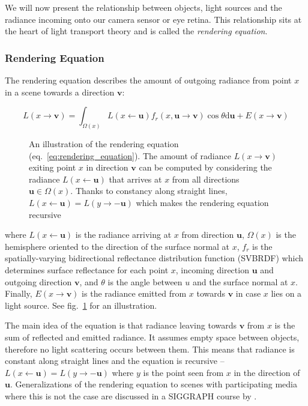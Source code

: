 We will now present the relationship between objects, light sources and the radiance incoming onto our camera sensor or eye retina. This relationship sits at the heart of light transport theory and is called the \textit{rendering equation}.

\subsubsection{Rendering Equation}
\label{section:background-projection_mapping-light_transport-rendering_equation}

The rendering equation describes the amount of outgoing radiance from point \(x\) in a scene towards a direction \(\bm{v}\):

\begin{equation}
    \label{eq:rendering_equation}
    L(x \rightarrow \bm{v}) = \int_{\Omega(x)} L(x \leftarrow \bm{u}) f_r(x, \bm{u} \rightarrow \bm{v}) \cos \theta \mathrm{d}\bm{u} + E(x \rightarrow \bm{v})
\end{equation}

\begin{figure}[t]
    \centering
    \def\svgwidth{0.6\textwidth}
    
    \caption{An illustration of the rendering equation (eq.~\ref{eq:rendering_equation}). The amount of radiance \(L(x \rightarrow \bm{v})\) exiting point \(x\) in direction \(\bm{v}\) can be computed by considering the radiance \(L(x \leftarrow \bm{u})\) that arrives at \(x\) from all directions \(\bm{u} \in \Omega(x)\). Thanks to constancy along straight lines, \(L(x \leftarrow \bm{u}) = L(y \rightarrow \bm{-u})\) which makes the rendering equation recursive}
    \label{fig:background_rendering_eq}
\end{figure}

where \(L(x \leftarrow \bm{u})\) is the radiance arriving at \(x\) from direction \(\bm{u}\), \(\Omega(x)\) is the hemisphere oriented to the direction of the surface normal at \(x\), \(f_r\) is the spatially-varying bidirectional reflectance distribution function (SVBRDF) which determines surface reflectance for each point \(x\), incoming direction \(\bm{u}\) and outgoing direction \(\bm{v}\), and \(\theta\) is the angle between \(u\) and the surface normal at \(x\). Finally, \(E(x \rightarrow \bm{v})\) is the radiance emitted from \(x\) towards \(\bm{v}\) in case \(x\) lies on a light source. See fig.~\ref{fig:background_rendering_eq} for an illustration.

The main idea of the equation is that radiance leaving towards \(\bm{v}\) from \(x\) is the sum of reflected and emitted radiance. It assumes empty space between objects, therefore no light scattering occurs between them. This means that radiance is constant along straight lines and the equation is recursive -- \(L(x \leftarrow \bm{u}) = L(y \rightarrow -\bm{u})\) where \(y\) is the point seen from \(x\) in the direction of \(\bm{u}\). Generalizations of the rendering equation to scenes with participating media where this is not the case are discussed in a SIGGRAPH course by \citet{Novak2018}.

